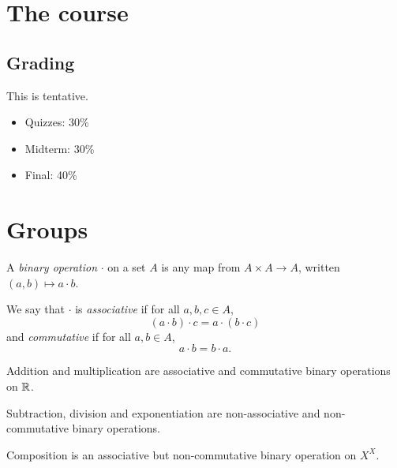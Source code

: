 \chapter*{The course} \label{chp:course}

\section*{Grading} \label{sec:grading}
This is tentative.
\begin{itemize}
    \item Quizzes: 30\%
    \item Midterm: 30\%
    \item Final: 40\%
\end{itemize}


\chapter{Groups} \label{chp:group}

\begin{definition} \label{def:binop}
    A \emph{binary operation} $\cdot$ on a set $A$ is any map
    from $A \times A \to A$, written $(a, b) \mapsto a \cdot b$.

    We say that $\cdot$ is \emph{associative} if for all $a, b, c \in A$, \[
        (a \cdot b) \cdot c = a \cdot (b \cdot c)
    \]
    and \emph{commutative} if for all $a, b \in A$, \[
        a \cdot b = b \cdot a.
    \]
\end{definition}
\begin{examples}
    \item Addition and multiplication are associative and commutative
        binary operations on $\mathbb{R}$.
    \item Subtraction, division and exponentiation are
        non-associative and non-commutative binary operations.
    \item Composition is an associative but non-commutative
        binary operation on $X^X$.
\end{examples}

